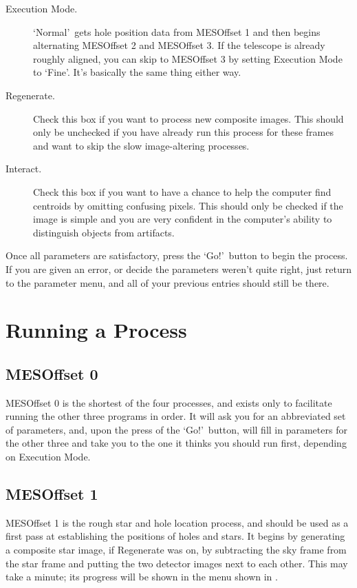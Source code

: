 \documentclass[10pt]{article}
\begin{document}
\begin{description}
    \item[Execution Mode.] \lq Normal\rq\ gets hole position data from MESOffset 1 and then begins alternating MESOffset 2 and MESOffset 3. If the telescope is already roughly aligned, you can skip to MESOffset 3 by setting Execution Mode to \lq Fine\rq. It's basically the same thing either way.
    
    \item[Regenerate.] Check this box if you want to process new composite images. This should only be unchecked if you have already run this process for these frames and want to skip the slow image-altering processes.
    
    \item[Interact.] Check this box if you want to have a chance to help the computer find centroids by omitting confusing pixels. This should only be checked if the image is simple and you are very confident in the computer's ability to distinguish objects from artifacts.

\end{description}

Once all parameters are satisfactory, press the \lq Go!\rq\ button to begin the process. If you are given an error, or decide the parameters weren't quite right, just return to the parameter menu, and all of your previous entries should still be there.

\section{Running a Process}

\subsection{MESOffset 0}

MESOffset 0 is the shortest of the four processes, and exists only to facilitate running the other three programs in order. It will ask you for an abbreviated set of parameters, and, upon the press of the \lq Go!\rq\ button, will fill in parameters for the other three and take you to the one it thinks you should run first, depending on Execution Mode.

\subsection{MESOffset 1}

MESOffset 1 is the rough star and hole location process, and should be used as a first pass at establishing the positions of holes and stars. It begins by generating a composite star image, if Regenerate was on, by subtracting the sky frame from the star frame and putting the two detector images next to each other. This may take a minute; its progress will be shown in the menu shown in .
\end{document}
